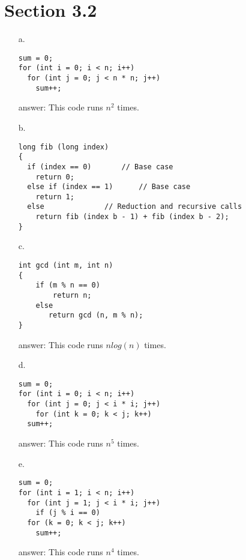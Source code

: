 \documentclass[11pt]{article}
\begin{document}
\section*{Section 3.2}
\begin{enumerate}
    
    \item[a.] 
    \begin{lstlisting}
sum = 0;
for (int i = 0; i < n; i++)
  for (int j = 0; j < n * n; j++)
    sum++;
    \end{lstlisting}
    
    \item[answer:] This code runs $n^2$ times.
    
    \item[b.]
    \begin{lstlisting}
long fib (long index)
{
  if (index == 0)		// Base case
    return 0;
  else if (index == 1)		// Base case
    return 1;
  else				// Reduction and recursive calls
    return fib (index b - 1) + fib (index b - 2);
}
    \end{lstlisting}
    
    
    \item[c.]
    \begin{lstlisting}
int gcd (int m, int n)
{
    if (m % n == 0)
        return n;
    else
       return gcd (n, m % n);
}
    \end{lstlisting}
    
    \item[answer:] This code runs $nlog(n)$ times.
    
    
    \item[d.]
    \begin{lstlisting}
sum = 0;
for (int i = 0; i < n; i++)
  for (int j = 0; j < i * i; j++)
    for (int k = 0; k < j; k++)
  sum++;
    \end{lstlisting}
    
    \item[answer:] This code runs $n^5$ times.
    
    
    \item[e.]
    \begin{lstlisting}
sum = 0;
for (int i = 1; i < n; i++)
  for (int j = 1; j < i * i; j++)
    if (j % i == 0)
  for (k = 0; k < j; k++)
    sum++;
    \end{lstlisting}
    
    \item[answer:] This code runs $n^4$ times.
    
\end{enumerate}
\end{document}
